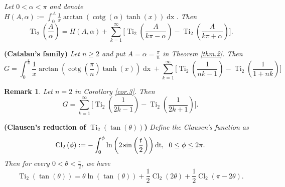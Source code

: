 \documentclass[preprint,12pt,nopreprintline]{elsarticle}
\begin{document}
\vspace{0.2cm}
\begin{corollary}\label{cor.2}
\textit{Let $0<\alpha<\pi$ and denote $H\left(A,\alpha\right):=\int_0^A\frac{1}{x}\operatorname{arctan}\left(\operatorname{cotg}\left(\alpha\right)\operatorname{tanh}\left(x\right)\right)\operatorname{dx}$. Then}
\begin{equation}\label{eq.7}
\operatorname{Ti}_2\left(\frac{A}{\alpha}\right)=H\left(A,\alpha\right)+\sum_{k=1}^{\infty}\Bigg[\operatorname{Ti}_2\left(\frac{A}{k\pi-\alpha}\right)-\operatorname{Ti}_2\left(\frac{A}{k\pi+\alpha}\right) \Bigg].
\end{equation}
\end{corollary}

\vspace{0.2cm}
\begin{corollary}\label{cor.3}\textbf{(Catalan’s family)}
\textit{Let $n\geq 2$ and put $A=\alpha=\frac{\pi}{n}$ in Theorem \ref{thm.2}. Then}
\begin{equation}
G=\int_0^{\frac{\pi}{n}}\frac{1}{x}\operatorname{arctan}\left(\operatorname{cotg}\left(\frac{\pi}{n}\right)\operatorname{tanh}\left(x\right)\right)
\operatorname{dx}+\sum_{k=1}^{\infty}\Bigg[\operatorname{Ti}_2\left(\frac{1}{nk-1}\right)-\operatorname{Ti}_2\left(\frac{1}{1+nk}\right) \Bigg]
\end{equation}  
\end{corollary}

\vspace{0.2cm}
\newtheorem{rem}{Remark}
\begin{rem}\label{rem.1}
\textit{Let $n=2$ in Corollary \ref{cor.3}. Then}
\begin{equation}
G=\sum_{k=1}^{\infty}\Bigg[\operatorname{Ti}_2\left(\frac{1}{2k-1}\right)-\operatorname{Ti}_2\left(\frac{1}{2k+1}\right) \Bigg].
\end{equation}
\end{rem}

\vspace{0.2cm}
\begin{corollary}{\textbf{(Clausen’s reduction of $\operatorname{Ti}_2\left(\operatorname{tan}\left(\theta\right)\right)$)}}\label{cor.4}
\textit{Define the Clausen’s function as}
\begin{equation}
\nonumber
\operatorname{Cl}_2\left(\phi\right):=-\int_0^{\phi}\operatorname{ln}\left(2\operatorname{sin}\left(\frac{t}{2}\right)\right)\operatorname{dt}, \hspace{0.2cm} 0\leq\phi\leq 2\pi.
\end{equation}
\textit{Then for every $0<\theta<\frac{\pi}{2}$, we have}
\begin{equation}
\operatorname{Ti}_2\left(\operatorname{tan}\left(\theta\right)\right)=\theta\operatorname{ln}\left(\operatorname{tan}\left(\theta\right)\right)+\frac{1}{2}\operatorname{Cl}_2\left(2\theta\right)+\frac{1}{2}\operatorname{Cl}_2\left(\pi-2\theta\right).
\end{equation}
\end{corollary}
\end{document}
